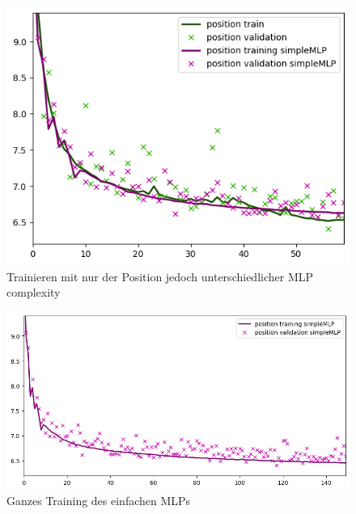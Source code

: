\documentclass[a4paper]{article}
\begin{document}
    \begin{figure}[h]
        \includegraphics[scale=0.6]{figures/fig7_training_different_mlp_complexity}
        \centering
        \caption{Trainieren mit nur der Position jedoch unterschiedlicher MLP complexity}
        \label{fig:training_different_complexity}
    \end{figure}

    \begin{figure}[h]
        \includegraphics[scale=0.6]{figures/fig8_training_simpler_mlp}
        \centering
        \caption{Ganzes Training des einfachen MLPs}
        \label{fig:training_simpler_mlp}
    \end{figure}
\end{document}
